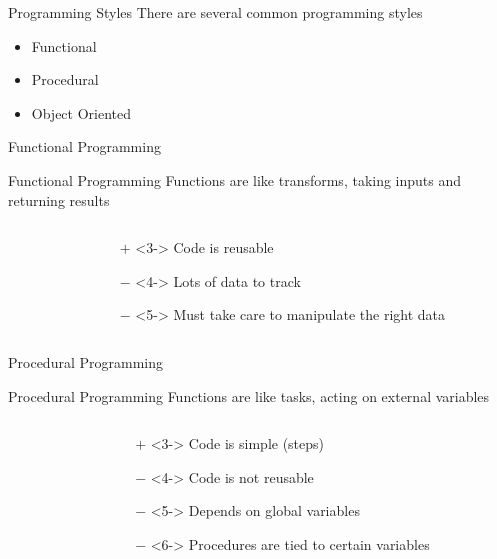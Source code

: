 \documentclass[mathserif]{beamer}
\providecommand{\inputcode}[1]{
  \begin{block}{}
    \scriptsize{}
  \end{block}
}
\begin{document}
\begin{frame}{Programming Styles}
  There are several common programming styles
  \begin{itemize}
    \item Functional
    \item Procedural
    \item Object Oriented
  \end{itemize}
\end{frame}

\begin{frame}{Functional Programming}
  \begin{block}{Functional Programming}
    Functions are like transforms, taking inputs and returning results
  \end{block}
  \begin{columns}
    \begin{column}{0.49\linewidth}
      \uncover<2->{\inputcode{styles/functional}}
    \end{column}
    \begin{column}{0.49\linewidth}
      \begin{itemize}
        \item[$+$]<3-> Code is reusable
        \item[$-$]<4-> Lots of data to track
        \item[$-$]<5-> Must take care to manipulate the right data
      \end{itemize}
    \end{column}
  \end{columns}
\end{frame}

\begin{frame}{Procedural Programming}
  \begin{block}{Procedural Programming}
    Functions are like tasks, acting on external variables
  \end{block}
  \begin{columns}
    \begin{column}{0.49\linewidth}
      \uncover<2->{\inputcode{styles/procedural}}
    \end{column}
    \begin{column}{0.49\linewidth}
      \begin{itemize}
        \item[$+$]<3-> Code is simple (steps)
        \item[$-$]<4-> Code is not reusable
        \item[$-$]<5-> Depends on global variables
        \item[$-$]<6-> Procedures are tied to certain variables
      \end{itemize}
    \end{column}
  \end{columns}
\end{frame}
\end{document}
